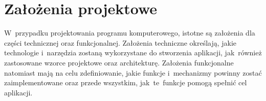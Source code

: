 \chapter{Założenia projektowe}
\label{ch:zalozenia_projektowe}

W~przypadku projektowania programu komputerowego, istotne są założenia dla części technicznej oraz funkcjonalnej.
Założenia techniczne określają, jakie technologie i~narzędzia zostaną wykorzystane do stworzenia aplikacji,
jak~również zastosowane wzorce projektowe oraz architekturę.
Założenia funkcjonalne natomiast mają na celu zdefiniowanie, jakie funkcje i~mechanizmy powinny zostać zaimplementowane
oraz przede wszystkim, jak~te~funkcje pomogą spełnić cel aplikacji.


